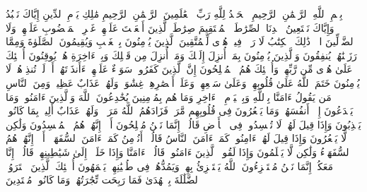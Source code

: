 \startbuffer[\q:1:1]
بِسۡمِ ٱللَّهِ ٱلرَّحۡمَٰنِ ٱلرَّحِیمِ%
\stopbuffer%
\startbuffer[\q:1:2]
ٱلۡحَمۡدُ لِلَّهِ رَبِّ ٱلۡعَٰلَمِینَ%
\stopbuffer%
\startbuffer[\q:1:3]
ٱلرَّحۡمَٰنِ ٱلرَّحِیمِ%
\stopbuffer%
\startbuffer[\q:1:4]
مَٰلِكِ یَوۡمِ ٱلدِّینِ%
\stopbuffer%
\startbuffer[\q:1:5]
إِیَّاكَ نَعۡبُدُ وَإِیَّاكَ نَسۡتَعِینُ%
\stopbuffer%
\startbuffer[\q:1:6]
ٱهۡدِنَا ٱلصِّرَٰطَ ٱلۡمُسۡتَقِیمَ%
\stopbuffer%
\startbuffer[\q:1:7]
صِرَٰطَ ٱلَّذِینَ أَنۡعَمۡتَ عَلَیۡهِمۡ غَیۡرِ ٱلۡمَغۡضُوبِ عَلَیۡهِمۡ وَلَا ٱلضَّاۤلِّینَ%
\stopbuffer%
\startbuffer[\q:2:1]
الۤمۤ%
\stopbuffer%
\startbuffer[\q:2:2]
ذَٰلِكَ ٱلۡكِتَٰبُ لَا رَیۡبَۛ فِیهِۛ هُدࣰى لِّلۡمُتَّقِینَ%
\stopbuffer%
\startbuffer[\q:2:3]
ٱلَّذِینَ یُؤۡمِنُونَ بِٱلۡغَیۡبِ وَیُقِیمُونَ ٱلصَّلَوٰةَ وَمِمَّا رَزَقۡنَٰهُمۡ یُنفِقُونَ%
\stopbuffer%
\startbuffer[\q:2:4]
وَٱلَّذِینَ یُؤۡمِنُونَ بِمَاۤ أُنزِلَ إِلَیۡكَ وَمَاۤ أُنزِلَ مِن قَبۡلِكَ وَبِٱلۡءَاخِرَةِ هُمۡ یُوقِنُونَ%
\stopbuffer%
\startbuffer[\q:2:5]
أُو۟لَٰۤئِكَ عَلَىٰ هُدࣰى مِّن رَّبِّهِمۡۖ وَأُو۟لَٰۤئِكَ هُمُ ٱلۡمُفۡلِحُونَ%
\stopbuffer%
\startbuffer[\q:2:6]
إِنَّ ٱلَّذِینَ كَفَرُوا۟ سَوَاۤءٌ عَلَیۡهِمۡ ءَأَنذَرۡتَهُمۡ أَمۡ لَمۡ تُنذِرۡهُمۡ لَا یُؤۡمِنُونَ%
\stopbuffer%
\startbuffer[\q:2:7]
خَتَمَ ٱللَّهُ عَلَىٰ قُلُوبِهِمۡ وَعَلَىٰ سَمۡعِهِمۡۖ وَعَلَىٰۤ أَبۡصَٰرِهِمۡ غِشَٰوَةࣱۖ وَلَهُمۡ عَذَابٌ عَظِیمࣱ%
\stopbuffer%
\startbuffer[\q:2:8]
وَمِنَ ٱلنَّاسِ مَن یَقُولُ ءَامَنَّا بِٱللَّهِ وَبِٱلۡیَوۡمِ ٱلۡءَاخِرِ وَمَا هُم بِمُؤۡمِنِینَ%
\stopbuffer%
\startbuffer[\q:2:9]
یُخَٰدِعُونَ ٱللَّهَ وَٱلَّذِینَ ءَامَنُوا۟ وَمَا یَخۡدَعُونَ إِلَّاۤ أَنفُسَهُمۡ وَمَا یَشۡعُرُونَ%
\stopbuffer%
\startbuffer[\q:2:10]
فِی قُلُوبِهِم مَّرَضࣱ فَزَادَهُمُ ٱللَّهُ مَرَضࣰاۖ وَلَهُمۡ عَذَابٌ أَلِیمُۢ بِمَا كَانُوا۟ یَكۡذِبُونَ%
\stopbuffer%
\startbuffer[\q:2:11]
وَإِذَا قِیلَ لَهُمۡ لَا تُفۡسِدُوا۟ فِی ٱلۡأَرۡضِ قَالُوۤا۟ إِنَّمَا نَحۡنُ مُصۡلِحُونَ%
\stopbuffer%
\startbuffer[\q:2:12]
أَلَاۤ إِنَّهُمۡ هُمُ ٱلۡمُفۡسِدُونَ وَلَٰكِن لَّا یَشۡعُرُونَ%
\stopbuffer%
\startbuffer[\q:2:13]
وَإِذَا قِیلَ لَهُمۡ ءَامِنُوا۟ كَمَاۤ ءَامَنَ ٱلنَّاسُ قَالُوۤا۟ أَنُؤۡمِنُ كَمَاۤ ءَامَنَ ٱلسُّفَهَاۤءُۗ أَلَاۤ إِنَّهُمۡ هُمُ ٱلسُّفَهَاۤءُ وَلَٰكِن لَّا یَعۡلَمُونَ%
\stopbuffer%
\startbuffer[\q:2:14]
وَإِذَا لَقُوا۟ ٱلَّذِینَ ءَامَنُوا۟ قَالُوۤا۟ ءَامَنَّا وَإِذَا خَلَوۡا۟ إِلَىٰ شَیَٰطِینِهِمۡ قَالُوۤا۟ إِنَّا مَعَكُمۡ إِنَّمَا نَحۡنُ مُسۡتَهۡزِءُونَ%
\stopbuffer%
\startbuffer[\q:2:15]
ٱللَّهُ یَسۡتَهۡزِئُ بِهِمۡ وَیَمُدُّهُمۡ فِی طُغۡیَٰنِهِمۡ یَعۡمَهُونَ%
\stopbuffer%
\startbuffer[\q:2:16]
أُو۟لَٰۤئِكَ ٱلَّذِینَ ٱشۡتَرَوُا۟ ٱلضَّلَٰلَةَ بِٱلۡهُدَىٰ فَمَا رَبِحَت تِّجَٰرَتُهُمۡ وَمَا كَانُوا۟ مُهۡتَدِینَ%
